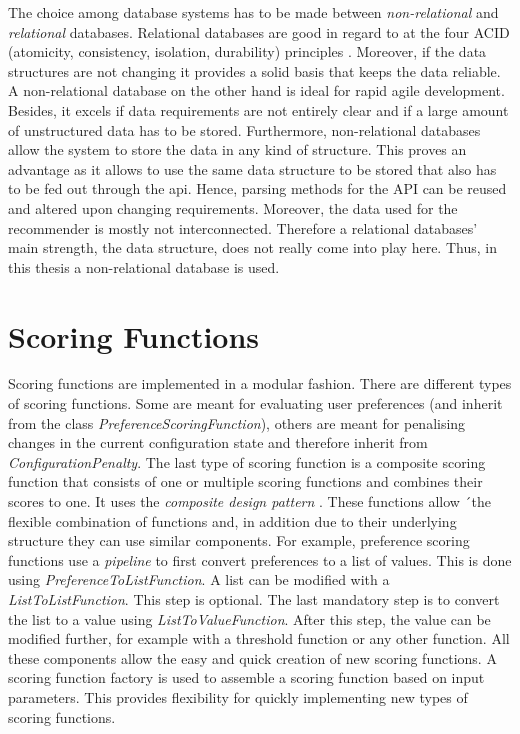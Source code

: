 The choice among database systems has to be made between \emph{non-relational} and \emph{relational} databases. Relational databases are good in regard to at the four ACID (atomicity, consistency, isolation, durability) principles \cite{chrysanthis1998recovery, cookACIDBASEDatabase2009}. Moreover, if the data structures are not changing it provides a solid basis that keeps the data reliable. A non-relational database on the other hand is ideal for rapid agile development. Besides, it excels if data requirements are not entirely clear and if a large amount of unstructured  data has to be stored. Furthermore, non-relational databases allow the system to store the data in any kind of structure. This proves an advantage as it allows to use the same data structure to be stored that also has to be fed out through the api. Hence, parsing methods for the API can be reused and altered upon changing requirements. Moreover, the data used for the recommender is mostly not interconnected. Therefore a relational databases' main strength, the data structure, does not really come into play here. Thus, in this thesis a non-relational database is used. 

\section{Scoring Functions}
\label{sec:DesignImplementation:ScroingFunctions}

Scoring functions are implemented in a modular fashion. There are different types of scoring functions. Some are meant for evaluating user preferences (and inherit from the class \emph{PreferenceScoringFunction}), others are meant for penalising changes in the current configuration state and therefore inherit from  \emph{ConfigurationPenalty}. The last type of scoring function is a composite scoring function that consists of one or multiple scoring functions and combines their scores to one. It uses the \emph{composite design pattern} \cite{gamma2015design}. These functions allow ´the flexible combination of functions and, in addition due to their underlying structure they can use similar components. For example, preference scoring functions use a \emph{pipeline} \cite{gamma2015design} to first convert preferences to a list of values. This is done using \emph{PreferenceToListFunction}. A list can be modified with a \emph{ListToListFunction}. This step is optional. The last mandatory step is to convert the list to a value using \emph{ListToValueFunction}. After this step, the value can be modified further, for example with a threshold function or any other function. All these components allow the easy and quick creation of new scoring functions. A scoring function factory is used to assemble a scoring function based on input parameters. This provides flexibility for quickly implementing new types of scoring functions.

